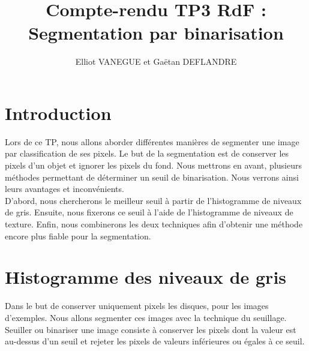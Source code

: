 \documentclass[11pt]{article}
\title{Compte-rendu TP3 RdF : Segmentation par binarisation}
\author{Elliot VANEGUE et Gaëtan DEFLANDRE}
\begin{document}


  \maketitle
  
  \mbox{}
  \newpage
  \clearpage
  
  \section*{Introduction}
  Lors de ce TP, nous allons aborder différentes manières de segmenter une image par 
  classification de ses pixels. Le but de la segmentation est de  conserver les pixels d'un 
  objet et ignorer les pixels du fond. Nous mettrons en avant, plusieurs méthodes permettant 
  de déterminer un seuil de binarisation. Nous verrons ainsi leurs avantages et inconvénients.\\
  
  D'abord, nous chercherons le meilleur seuil à partir de l'histogramme de niveaux de gris.
  Ensuite, nous fixerons ce seuil à l'aide de l'histogramme de niveaux de texture.
  Enfin, nous combinerons les deux techniques afin d'obtenir une méthode encore plus 
  fiable pour la segmentation.\\
  
  
  
  \section{Histogramme des niveaux de gris}
  
  Dans le but de conserver uniquement pixels les disques, pour les images d'exemples. Nous allons segmenter ces
  images avec la technique du seuillage. Seuiller ou binariser une image consiste à conserver les pixels dont
  la valeur est au-dessus d'un seuil et rejeter les pixels de valeurs inférieures ou égales à ce seuil.\\
  
\end{document}
